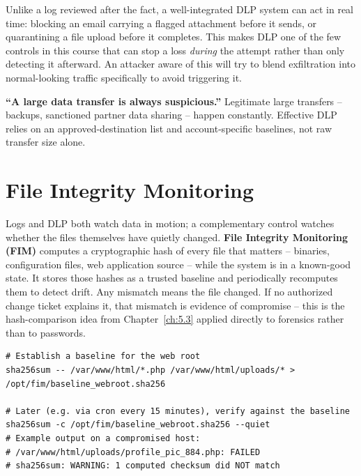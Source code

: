 \begin{example}
Unlike a log reviewed after the fact, a well-integrated DLP system can act in real time: blocking an
email carrying a flagged attachment before it sends, or quarantining a file upload before it
completes. This makes DLP one of the few controls in this course that can stop a loss \emph{during}
the attempt rather than only detecting it afterward. An attacker aware of this will try to blend
exfiltration into normal-looking traffic specifically to avoid triggering it.
\end{example}

\begin{misconception}
\textbf{``A large data transfer is always suspicious.''} Legitimate large transfers -- backups,
sanctioned partner data sharing -- happen constantly. Effective DLP relies on an approved-destination
list and account-specific baselines, not raw transfer size alone.
\end{misconception}

\section{File Integrity Monitoring}

Logs and DLP both watch data in motion; a complementary control watches whether the files
themselves have quietly changed. \textbf{File Integrity Monitoring (FIM)} computes a cryptographic
hash of every file that matters -- binaries, configuration files, web application source -- while
the system is in a known-good state. It stores those hashes as a trusted baseline and periodically
recomputes them to detect drift. Any mismatch means the file changed. If no authorized change ticket
explains it, that mismatch is evidence of compromise -- this is the hash-comparison idea from
Chapter~\ref{ch:5.3} applied directly to forensics rather than to passwords.

\begin{lstlisting}[caption={A hand-rolled SHA-256 FIM baseline (Linux/macOS)}]
# Establish a baseline for the web root
sha256sum -- /var/www/html/*.php /var/www/html/uploads/* > /opt/fim/baseline_webroot.sha256

# Later (e.g. via cron every 15 minutes), verify against the baseline
sha256sum -c /opt/fim/baseline_webroot.sha256 --quiet
# Example output on a compromised host:
# /var/www/html/uploads/profile_pic_884.php: FAILED
# sha256sum: WARNING: 1 computed checksum did NOT match
\end{lstlisting}

